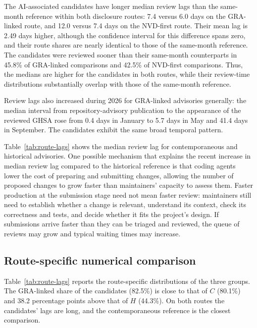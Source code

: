 \documentclass[smallextended,natbib]{svjour3}
\begin{document}
The AI-associated candidates have longer median review lags than the same-month
reference within both disclosure routes: 7.4 versus 6.0 days on the
GRA-linked route, and 12.0 versus 7.4 days on the NVD-first route.
Their mean lag is 2.49 days higher, although the confidence interval for this
difference spans zero, and their route shares are nearly identical to
those of the same-month reference. The candidates were reviewed sooner
than their same-month counterparts in 45.8\% of GRA-linked comparisons
and 42.5\% of NVD-first comparisons. Thus, the medians are higher for
the candidates in both routes, while their review-time distributions
substantially overlap with those of the same-month reference.

Review lags also increased during 2026 for GRA-linked advisories
generally: the median interval from repository-advisory publication to
the appearance of the reviewed GHSA rose from 0.4 days in January to
5.7 days in May and 41.4 days in September. The candidates exhibit the
same broad temporal pattern.

Table~\ref{tab:route-lags} shows the median review lag for contemporaneous and historical advisories. 
One possible mechanism 
that explains the recent increase in median review lag compared to the historical reference  
is that coding agents lower the cost of preparing
and submitting changes, allowing the number of proposed changes to grow
faster than maintainers' capacity to assess them. Faster production at the
submission stage need not mean faster review: maintainers still need to
establish whether a change is relevant, understand its context, check its
correctness and tests, and decide whether it fits the project's design.
If submissions arrive faster than they can be triaged and reviewed, the
queue of reviews may grow and typical waiting times may increase.   





\subsection{Route-specific numerical comparison}
\label{sec:candidate-anatomy}

Table~\ref{tab:route-lags} reports the route-specific distributions of the
three groups.  The GRA-linked share of the candidates (82.5\%) is close to
that of $C$ (80.1\%) and 38.2 percentage points above that of $H$ (44.3\%).
On both routes the candidates' lags are long, and the contemporaneous
reference is the closest comparison.
\end{document}
